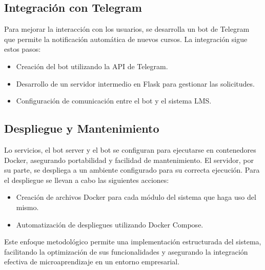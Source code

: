 \subsection{Integración con Telegram}  
Para mejorar la interacción con los usuarios, se desarrolla un bot de Telegram
que permite la notificación automática de nuevos cursos. La integración sigue
estos pasos:  

\begin{itemize}  
    \item Creación del bot utilizando la API de Telegram.  
    \item Desarrollo de un servidor intermedio en Flask para gestionar las
    solicitudes.  
    \item Configuración de comunicación entre el bot y el sistema LMS.  
\end{itemize}  

\subsection{Despliegue y Mantenimiento}  
Lo servicios, el bot server y el bot se configuran para ejecutarse en
contenedores Docker, asegurando portabilidad y facilidad de mantenimiento.
El servidor, por su parte, se despliega a un ambiente configurado para su
correcta ejecución.
Para el despliegue se llevan a cabo las siguientes acciones:  

\begin{itemize}  
    \item Creación de archivos Docker para cada módulo del sistema que haga uso del mismo.  
    \item Automatización de despliegues utilizando Docker Compose.  
\end{itemize}  

Este enfoque metodológico permite una implementación estructurada del sistema,
facilitando la optimización de sus funcionalidades y asegurando la integración
efectiva de microaprendizaje en un entorno empresarial.  
